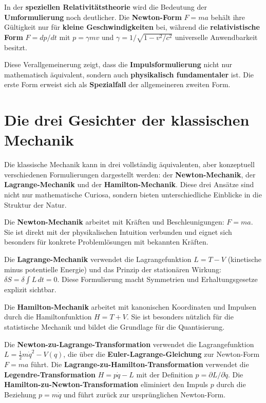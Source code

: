 \documentclass[12pt,a4paper]{report}
\begin{document}
	In der \textbf{speziellen Relativitätstheorie} wird die Bedeutung der \textbf{Umformulierung} noch deutlicher. Die \textbf{Newton-Form} $F = ma$ behält ihre Gültigkeit nur für \textbf{kleine Geschwindigkeiten} bei, während die \textbf{relativistische Form} $F = dp/dt$ mit $p = \gamma mv$ und $\gamma = 1/\sqrt{1-v^2/c^2}$ universelle Anwendbarkeit besitzt.
	
	Diese Verallgemeinerung zeigt, dass die \textbf{Impulsformulierung} nicht nur mathematisch äquivalent, sondern auch \textbf{physikalisch fundamentaler} ist. Die erste Form erweist sich als \textbf{Spezialfall} der allgemeineren zweiten Form.
	
	\section{Die drei Gesichter der klassischen Mechanik}
	
	Die klassische Mechanik kann in drei vollständig äquivalenten, aber konzeptuell verschiedenen Formulierungen dargestellt werden: der \textbf{Newton-Mechanik}, der \textbf{Lagrange-Mechanik} und der \textbf{Hamilton-Mechanik}. Diese drei Ansätze sind nicht nur mathematische Curiosa, sondern bieten unterschiedliche Einblicke in die Struktur der Natur.
	
	Die \textbf{Newton-Mechanik} arbeitet mit Kräften und Beschleunigungen: $F = ma$. Sie ist direkt mit der physikalischen Intuition verbunden und eignet sich besonders für konkrete Problemlösungen mit bekannten Kräften.
	
	Die \textbf{Lagrange-Mechanik} verwendet die Lagrangefunktion $L = T - V$ (kinetische minus potentielle Energie) und das Prinzip der stationären Wirkung: $\delta S = \delta \int L \, dt = 0$. Diese Formulierung macht Symmetrien und Erhaltungsgesetze explizit sichtbar.
	
	Die \textbf{Hamilton-Mechanik} arbeitet mit kanonischen Koordinaten und Impulsen durch die Hamiltonfunktion $H = T + V$. Sie ist besonders nützlich für die statistische Mechanik und bildet die Grundlage für die Quantisierung.
	
	Die \textbf{Newton-zu-Lagrange-Transformation} verwendet die Lagrangefunktion $L = \frac{1}{2}m\dot{q}^2 - V(q)$, die über die \textbf{Euler-Lagrange-Gleichung} zur Newton-Form $F = ma$ führt. Die \textbf{Lagrange-zu-Hamilton-Transformation} verwendet die \textbf{Legendre-Transformation} $H = p\dot{q} - L$ mit der Definition $p = \partial L/\partial \dot{q}$. Die \textbf{Hamilton-zu-Newton-Transformation} eliminiert den Impuls $p$ durch die Beziehung $p = m\dot{q}$ und führt zurück zur ursprünglichen Newton-Form.
	
\end{document}
